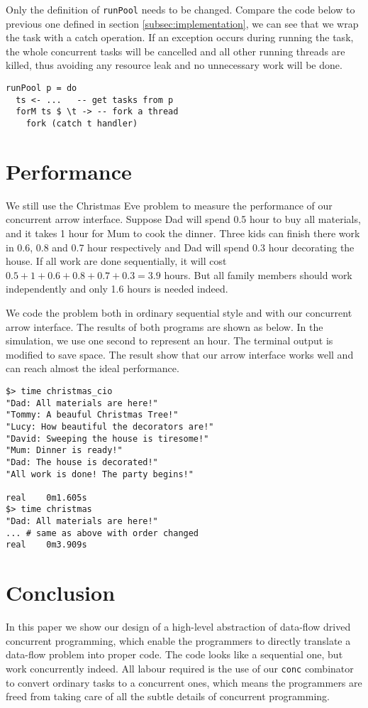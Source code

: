 \documentclass[conference]{IEEEtran}
\begin{document}
Only the definition of \texttt{runPool} needs to be changed. Compare the code below to previous
one defined in section \ref{subsec:implementation}, we can see that we wrap the task with a
catch operation. If an exception occurs during running the task, the whole concurrent tasks
will be cancelled and all other running threads are killed, thus avoiding any resource leak and
no unnecessary work will be done.
\begin{verbatim}
runPool p = do
  ts <- ...   -- get tasks from p
  forM ts $ \t -> -- fork a thread
    fork (catch t handler)
\end{verbatim}

\section{Performance}
We still use the Christmas Eve problem to measure the performance of our concurrent
arrow interface. Suppose Dad will spend 0.5 hour to buy all materials, and it takes
1 hour for Mum to cook the dinner. Three kids can finish there work in 0.6, 0.8 and 0.7 hour
respectively and Dad will spend 0.3 hour decorating the house. If all work are done
sequentially, it will cost $0.5+1+0.6+0.8+0.7+0.3=3.9$ hours. But all family members should
work independently and only 1.6 hours is needed indeed.

We code the problem both in ordinary sequential style and with our concurrent arrow interface.
The results of both programs are shown as below. In the simulation, we use one second to represent
an hour. The terminal output is modified to save space. The result show that our arrow
interface works well and can reach almost the ideal performance.
\begin{verbatim}
$> time christmas_cio
"Dad: All materials are here!"
"Tommy: A beauful Christmas Tree!"
"Lucy: How beautiful the decorators are!"
"David: Sweeping the house is tiresome!"
"Mum: Dinner is ready!"
"Dad: The house is decorated!"
"All work is done! The party begins!"

real	0m1.605s
$> time christmas
"Dad: All materials are here!"
... # same as above with order changed
real	0m3.909s
\end{verbatim}

\section{Conclusion}
In this paper we show our design of a high-level abstraction of data-flow drived concurrent
programming, which enable the programmers to directly translate a data-flow problem into proper
code. The code looks like a sequential one, but work concurrently indeed. All labour required is
the use of our \texttt{conc} combinator to convert ordinary tasks to a concurrent ones, which means
the programmers are freed from taking care of all the subtle details of concurrent programming.
\end{document}
